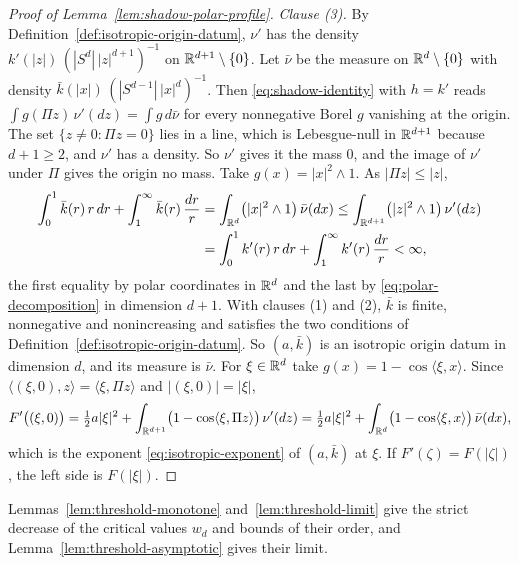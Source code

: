 \begin{proof}[Proof of Lemma~\ref{lem:shadow-polar-profile}]
\emph{Clause (3).} By Definition~\ref{def:isotropic-origin-datum}, $\nu'$ has the density
$k'(|z|)\,(|S^{d}|\,|z|^{d+1})^{-1}$ on $\mathbb{R}^{d+1} \setminus \{0\}$. Let $\bar\nu$ be the measure
on $\mathbb{R}^d \setminus \{0\}$ with density $\bar k(|x|)\,(|S^{d-1}|\,|x|^{d})^{-1}$. Then
\ref{eq:shadow-identity} with $h = k'$ reads $\int g(\Pi z)\,\nu'(dz) = \int g\,d\bar\nu$ for
every nonnegative Borel $g$ vanishing at the origin. The set $\{z \ne 0 : \Pi z = 0\}$ lies in a
line, which is Lebesgue-null in $\mathbb{R}^{d+1}$ because $d + 1 \ge 2$, and $\nu'$ has a density. So
$\nu'$ gives it the mass $0$, and the image of $\nu'$ under $\Pi$ gives the origin no mass. Take
$g(x) = |x|^2 \wedge 1$. As
$|\Pi z| \le |z|$,
\[
\begin{aligned}
  \int_0^1 \bar k(r)\,r\,dr + \int_1^\infty \bar k(r)\,\frac{dr}{r}
   &= \int_{\mathbb{R}^d}\bigl(|x|^2 \wedge 1\bigr)\,\bar\nu(dx)
   \le \int_{\mathbb{R}^{d+1}}\bigl(|z|^2 \wedge 1\bigr)\,\nu'(dz) \\
   &= \int_0^1 k'(r)\,r\,dr + \int_1^\infty k'(r)\,\frac{dr}{r} < \infty ,
\end{aligned}
\]
the first equality by polar coordinates in $\mathbb{R}^d$ and the last by
\ref{eq:polar-decomposition} in dimension $d + 1$. With clauses (1) and (2), $\bar k$ is finite,
nonnegative and nonincreasing and satisfies the two conditions of
Definition~\ref{def:isotropic-origin-datum}. So $(a,\bar k)$ is an isotropic origin datum in dimension $d$,
and its \Levy{} measure is $\bar\nu$. For $\xi \in \mathbb{R}^d$ take $g(x) = 1 - \cos\langle\xi,x\rangle$.
Since $\langle(\xi,0),z\rangle = \langle\xi,\Pi z\rangle$ and $|(\xi,0)| = |\xi|$,
\[
  F'\bigl((\xi,0)\bigr) = \tfrac12 a|\xi|^2
     + \int_{\mathbb{R}^{d+1}}\bigl(1 - \cos\langle\xi,\Pi z\rangle\bigr)\,\nu'(dz)
   = \tfrac12 a|\xi|^2 + \int_{\mathbb{R}^d}\bigl(1 - \cos\langle\xi,x\rangle\bigr)\,\bar\nu(dx) ,
\]
which is the exponent \ref{eq:isotropic-exponent} of $(a,\bar k)$ at $\xi$. If
$F'(\zeta) = F(|\zeta|)$, the left side is $F(|\xi|)$.
\end{proof}

Lemmas~\ref{lem:threshold-monotone} and~\ref{lem:threshold-limit} give the strict decrease of the
critical values $w_d$ and bounds of their order, and Lemma~\ref{lem:threshold-asymptotic} gives
their limit.

